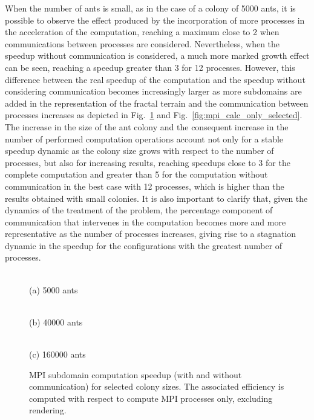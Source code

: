 When the number of ants is small, as in the case of a colony of 5000 ants, it is possible to observe the effect produced by the incorporation of more processes in the acceleration of the computation, reaching a maximum close to 2 when communications between processes are considered. Nevertheless, when the speedup without communication is considered, a much more marked growth effect can be seen, reaching a speedup greater than 3 for 12 processes. However, this difference between the real speedup of the computation and the speedup without considering communication becomes increasingly larger as more subdomains are added in the representation of the fractal terrain and the communication between processes increases as depicted in Fig.~\ref{fig:mpi_speedup_selected} and Fig.~\ref{fig:mpi_calc_only_selected}. The increase in the size of the ant colony and the consequent increase in the number of performed computation operations account not only for a stable speedup dynamic as the colony size grows with respect to the number of processes, but also for increasing results, reaching speedups close to 3 for the complete computation and greater than 5 for the computation without communication in the best case with 12 processes, which is higher than the results obtained with small colonies. It is also important to clarify that, given the dynamics of the treatment of the problem, the percentage component of communication that intervenes in the computation becomes more and more representative as the number of processes increases, giving rise to a stagnation dynamic in the speedup for the configurations with the greatest number of processes.
\begin{figure}[!htbp]
\centering
\begin{minipage}{0.48\columnwidth}
    \centering
    \\[-2mm]
    {\footnotesize (a) 5000 ants}
\end{minipage}
\hfill
\begin{minipage}{0.48\columnwidth}
    \centering
    \\[-2mm]
    {\footnotesize (b) 40000 ants}
\end{minipage}

\vspace{1mm}
\begin{minipage}{0.62\columnwidth}
    \centering
    \\[-2mm]
    {\footnotesize (c) 160000 ants}
\end{minipage}
\caption{MPI subdomain computation speedup (with and without communication) for selected colony sizes. The associated efficiency is computed with respect to compute MPI processes only, excluding rendering.}
\label{fig:mpi_speedup_selected}
\end{figure}

